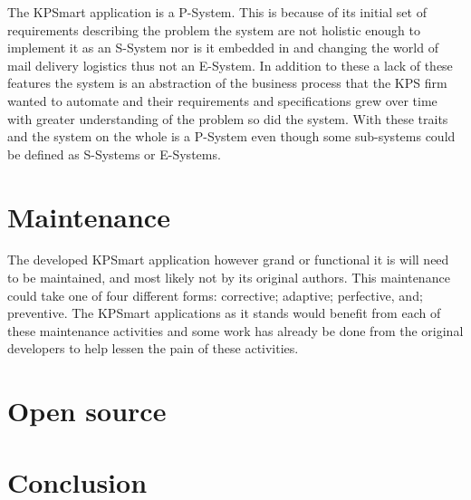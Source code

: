 \documentclass{style/CRPITStyle}
\renewcommand{\cite}{\citep}
\begin{document}
\vspace{.1in}

The KPSmart application is a P-System. This is because of its initial set of
requirements describing the problem the system are not holistic enough to
implement it as an S-System nor is it embedded in and changing the world of mail
delivery logistics thus not an E-System. In addition to these a lack of
these features the system is an abstraction of the business process that the
KPS firm wanted to automate and their requirements and specifications grew over
time with greater understanding of the problem so did the system. With these
traits and the system on the whole is a P-System even though some sub-systems
could be defined as S-Systems or E-Systems.

\section{Maintenance}
%
%
%

The developed KPSmart application however grand or functional it is will need
to be maintained, and most likely not by its original authors. This maintenance
could take one of four different forms: corrective; adaptive; perfective, and;
preventive. The KPSmart applications as it stands would benefit from each of
these maintenance activities and some work has already be done from the original
developers to help lessen the pain of these activities.

\section{Open source}

\cite{raymond:1999}

\section{Conclusion}



\end{document}
